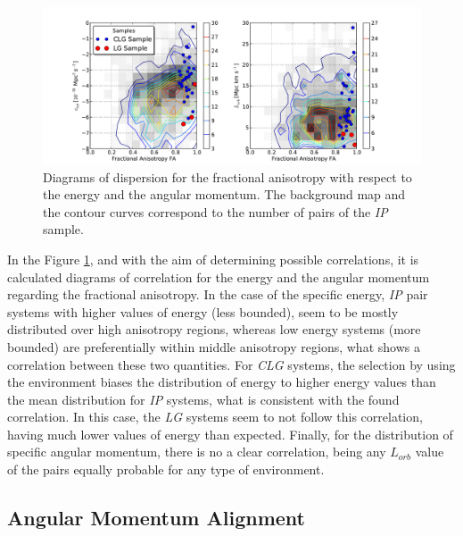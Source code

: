\
\begin{figure}[htbp]
	\centering
	\includegraphics[trim = 20mm 0mm 35mm 10mm, clip, width=1.0\textwidth]
	{./figures/4_results/CLG_FA_E-L.pdf}
	
	\caption{\small{Diagrams of dispersion for the fractional anisotropy 
	with respect to the energy and the angular momentum. The background
	map and the contour curves correspond to the number of pairs of the
	\textit{IP} sample.}}
	\label{fig:CLG_FA_E-L}
\end{figure}


In the Figure \ref{fig:CLG_FA_E-L}, and with the aim of determining 
possible correlations, it is calculated diagrams of correlation for the 
energy and the angular momentum regarding the fractional anisotropy. In 
the case of the specific energy, \textit{IP} pair systems with higher
values of energy (less bounded), seem to be mostly distributed over high
anisotropy regions, whereas low energy systems (more bounded) are 
preferentially within middle anisotropy regions, what shows a correlation
between these two quantities. For \textit{CLG} systems, the selection by
using the environment biases the distribution of energy to higher energy 
values than the mean distribution for \textit{IP} systems, what is 
consistent with the found correlation. In this case, the \textit{LG} 
systems seem to not follow this correlation, having much lower values of 
energy than expected. Finally, for the distribution of specific angular 
momentum, there is no a clear correlation, being any $L_{orb}$ value of
the pairs equally probable for any type of environment.


	
	\subsection{Angular Momentum Alignment}
	\label{subsec:AngularMomentumAlineation}
	
